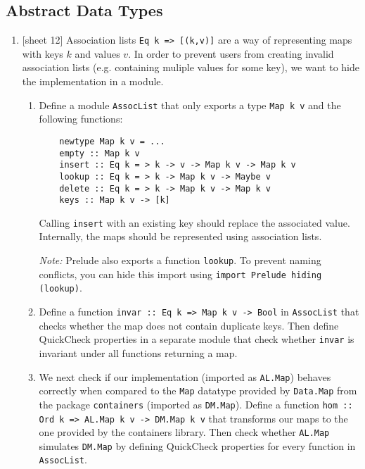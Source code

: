 \documentclass{article}
\def\code#1{\texttt{#1}}
\begin{document}
\subsection{Abstract Data Types}
\begin{enumerate}
    \item {[sheet 12]} Association lists \code{Eq k => [(k,v)]} are a way of representing maps with keys $k$ and values $v$. In order to prevent users from creating invalid association lists (e.g. containing muliple values for some key), we want to hide the implementation in a module.
        \begin{enumerate}
            \item Define a module \code{AssocList} that only exports a type \code{Map k v} and the following functions:
                \begin{verbatim}
    newtype Map k v = ...
    empty :: Map k v
    insert :: Eq k = > k -> v -> Map k v -> Map k v
    lookup :: Eq k = > k -> Map k v -> Maybe v
    delete :: Eq k = > k -> Map k v -> Map k v
    keys :: Map k v -> [k]
                \end{verbatim}
                Calling \code{insert} with an existing key should replace the associated value. Internally, the maps should be represented using association lists. \par
                \textit{Note:} Prelude also exports a function \code{lookup}. To prevent naming conflicts, you can hide this import using \code{import Prelude hiding (lookup)}.
            \item Define a function \code{invar :: Eq k => Map k v -> Bool} in \code{AssocList} that checks whether the map does not contain duplicate keys. Then define QuickCheck properties in a separate module that check whether \code{invar} is invariant under all functions returning a map.
            \item We next check if our implementation (imported as \code{AL.Map}) behaves correctly when compared to the \code{Map} datatype provided by \code{Data.Map} from the package \code{containers} (imported as \code{DM.Map}). Define a function \code{hom :: Ord k => AL.Map k v -> DM.Map k v} that transforms our maps to the one provided by the containers library. Then check whether \code{AL.Map} simulates \code{DM.Map} by defining QuickCheck properties for every function in \code{AssocList}.
        \end{enumerate}
\end{enumerate}
\end{document}
